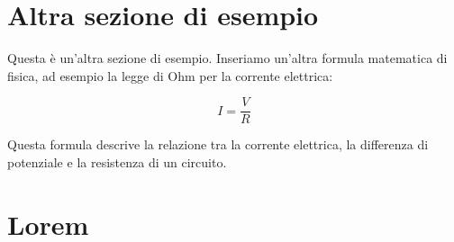 \documentclass[a4paper,11pt]{article}
\begin{document}
\begin{multicols}{3}
		
		\section{Altra sezione di esempio}
		
		Questa è un'altra sezione di esempio. Inseriamo un'altra formula matematica di fisica, ad esempio la legge di Ohm per la corrente elettrica:
		
		\begin{equation}
			I=\frac{V}{R}
		\end{equation}
		
		Questa formula descrive la relazione tra la corrente elettrica, la differenza di potenziale e la resistenza di un circuito.
		
		
		\section{Lorem}
		\lipsum[1-10]
	\end{multicols}
	
\end{document}
